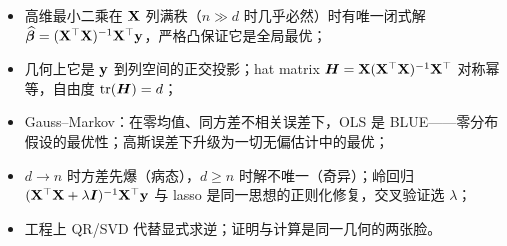 \begin{keybox}[本章要点]
\begin{itemize}
  \item 高维最小二乘在 $\mathbf{X}$ 列满秩（$n \gg d$ 时几乎必然）时有唯一闭式解 $\widehat{\bm{\beta}} = (\mathbf{X}^\top\mathbf{X})^{-1}\mathbf{X}^\top\mathbf{y}$，严格凸保证它是全局最优；
  \item 几何上它是 $\mathbf{y}$ 到列空间的正交投影；hat matrix $\bm{H} = \mathbf{X}(\mathbf{X}^\top\mathbf{X})^{-1}\mathbf{X}^\top$ 对称幂等，自由度 $\mathrm{tr}(\bm{H}) = d$；
  \item Gauss--Markov：在零均值、同方差不相关误差下，OLS 是 BLUE——零分布假设的最优性；高斯误差下升级为一切无偏估计中的最优；
  \item $d \to n$ 时方差先爆（病态），$d \ge n$ 时解不唯一（奇异）；岭回归 $(\mathbf{X}^\top\mathbf{X} + \lambda\bm{I})^{-1}\mathbf{X}^\top\mathbf{y}$ 与 lasso 是同一思想的正则化修复，交叉验证选 $\lambda$；
  \item 工程上 QR/SVD 代替显式求逆；证明与计算是同一几何的两张脸。
\end{itemize}
\end{keybox}

